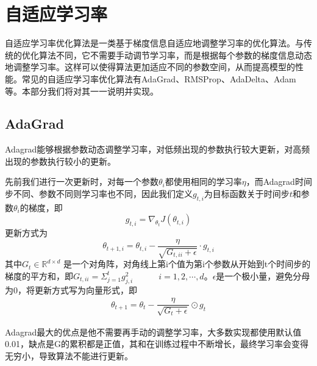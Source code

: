 \documentclass[10.5pt,a4paper]{article}%
\begin{document}
        \section{自适应学习率}
        自适应学习率优化算法是一类基于梯度信息自适应地调整学习率的优化算法。与传统的优化算法不同，它不需要手动调节学习率，而是根据每个参数的梯度信息动态地调整学习率。这样可以使得算法更加适应不同的参数空间，从而提高模型的性能。常见的自适应学习率优化算法有AdaGrad、RMSProp、AdaDelta、Adam等。本部分我们将对其一一说明并实现。
        \subsection{AdaGrad}
            Adagrad\cite{adagrad}能够根据参数动态调整学习率，对低频出现的参数执行较大更新，对高频出现的参数执行较小的更新。\par
            先前我们进行一次更新时，对每一个参数$\theta_i$都使用相同的学习率$\eta$，而Adagrad时间步不同、参数不同则学习率也不同，因此我们定义$g_{t,i}$为目标函数关于时间步$t$和参数$\theta_i$的梯度，即
            $$g_{t,i}=\nabla_{\theta_t}J(\theta_{t,i})$$
            更新方式为
            $$\theta_{t+1,i}=\theta_{t,i}-\dfrac{\eta}{\sqrt{G_{t,ii}+\epsilon}}\cdot g_{t,i}$$
            其中$G_t\in\mathbb{R}^{d\times d}$ 是一个对角阵，对角线上第i个值为第i个参数从开始到t个时间步的梯度的平方和，即$G_{t,ii}=\Sigma_{j=1}^tg_{j,i}^2\quad\qquad i=1,2,\cdots,d$。$\epsilon$是一个极小量，避免分母为0，将更新方式写为向量形式，即
            \begin{align*}
            \theta_{t+1}=\theta_t-\dfrac{\eta}{\sqrt{G_t+\epsilon}}\odot g_t 
            \end{align*}\par
            Adagrad最大的优点是他不需要再手动的调整学习率，大多数实现都使用默认值0.01，缺点是G的累积都是正值，其和在训练过程中不断增长，最终学习率会变得无穷小，导致算法不能进行更新。
\end{document}
